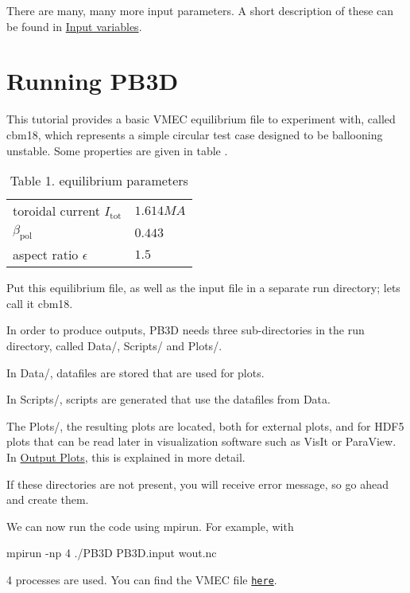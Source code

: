 There are many, many more input parameters. A short description of these can be found in \hyperlink{page_inputs}{Input variables}.\hypertarget{page_tutorial_tutorial_PB3D}{}\section{Running P\+B3D}\label{page_tutorial_tutorial_PB3D}
This tutorial provides a basic V\+M\+EC equilibrium file to experiment with, called {\ttfamily cbm18}, which represents a simple circular test case designed to be ballooning unstable. \cite{ferraro2010ELMbenchmark} Some properties are given in table . \hypertarget{page_tutorial_tutorial_PB3D_tab}{}
\tabulinesep=1mm
\begin{longtabu} spread 0pt [c]{*{2}{|X[-1]}|}
\caption{Table 1. equilibrium parameters}\label{page_tutorial_tutorial_PB3D_tab}\\
\hline
toroidal current $I_\text{tot}$  &$1.614MA$   \\
$\beta_\text{pol}$  &$0.443 $   \\
aspect ratio $\epsilon$  &$1.5 $   \\
\end{longtabu}


Put this equilibrium file, as well as the input file in a separate run directory; let\textquotesingle{}s call it {\ttfamily cbm18}.

In order to produce outputs, P\+B3D needs three sub-\/directories in the run directory, called {\ttfamily Data/}, {\ttfamily Scripts/} and {\ttfamily Plots/}.
\begin{DoxyItemize}
\item In {\ttfamily Data/}, datafiles are stored that are used for plots.
\item In {\ttfamily Scripts/}, scripts are generated that use the datafiles from {\ttfamily Data}.
\item The {\ttfamily Plots/}, the resulting plots are located, both for external plots, and for H\+D\+F5 plots that can be read later in visualization software such as Vis\+It or Para\+View. In \hyperlink{page_outputs_output_plots}{Output Plots}, this is explained in more detail.
\end{DoxyItemize}

If these directories are not present, you will receive error message, so go ahead and create them.

We can now run the code using {\ttfamily mpirun}. For example, with 
\begin{DoxyCode}
mpirun -np 4 ./PB3D PB3D.input wout.nc 
\end{DoxyCode}
 4 processes are used. You can find the V\+M\+EC file \href{wout.nc}{\tt here}.


